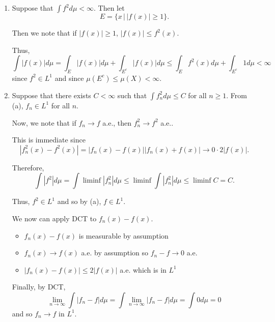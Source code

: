 \documentclass[12pt]{Qual}
\begin{document}
\begin{solution}$\,$
\begin{enumerate}[label=(\alph*)]
    \item Suppose that $\int f^2d\mu<\infty$. Then let $$E=\{x\,|\,|f(x)|\ge1\}.$$

    Then we note that if $|f(x)|\ge 1$, $|f(x)|\le f^2(x)$.

    Thus, $$\int |f(x)|d\mu=\int_E |f(x)|d\mu+\int_{E^c}|f(x)|d\mu\le\int_Ef^2(x)d\mu+\int_{E^c}1d\mu<\infty$$ since $f^2\in L^1$ and since $\mu(E^c)\le\mu(X)<\infty.$
    \item Suppose that there exists $C<\infty$ such that $\int f_n^2d\mu\le C$ for all $n\ge1$. From (a), $f_n\in L^1$ for all $n$.

    Now, we note that if $f_n\to f$ a.e., then $f_n^2\to f^2$ a.e..

    This is immediate since $$|f_n^2(x)-f^2(x)|=|f_n(x)-f(x)||f_n(x)+f(x)|\to0\cdot 2|f(x)|.$$

    Therefore, $$\int|f^2|d\mu=\int\liminf|f_n^2|d\mu\le\liminf\int|f_n^2|d\mu\le\liminf C=C.$$

    Thus, $f^2\in L^1$ and so by (a), $f\in L^1.$

    We now can apply DCT to $f_n(x)-f(x).$

    \begin{itemize}
        \item $f_n(x)-f(x)$ is measurable by assumption
        \item $f_n(x)\to f(x)$ a.e. by assumption so $f_n-f\to0$ a.e.
        \item $|f_n(x)-f(x)|\le 2|f(x)|$ a.e. which is in $L^1$
    \end{itemize}

    Finally, by DCT, $$\lim_{n\to\infty}\int|f_n-f|d\mu=\int\lim_{n\to\infty}|f_n-f|d\mu=\int0d\mu=0$$ and so $f_n\to f$ in $L^1.$

    \begin{comment}
    Now, let $\varepsilon>0$. By Egoroff, (since $\mu$ is a finite measure) there exists a set $A\subset X$ such that $\mu(X\backslash A)<\varepsilon$ and $f_n\to f$ uniformly on $A$.

    Thus, for all $x\in A$, there exists an $N$ such that $|f_n(x)-f(x)|<\varepsilon$ for all $n\ge N$.

    Therefore, \begin{align*}
        \int|f_n-f|d\mu&=\int_{X\backslash A}|f_n-f|d\mu+\int_A|f_n-f|d\mu\\
        &\le \int_{X\backslash A}|f_n-f|d\mu+\varepsilon\mu(A)\\
        &
    \end{align*}


\end{comment}
\end{enumerate}
\end{solution}
\end{document}
